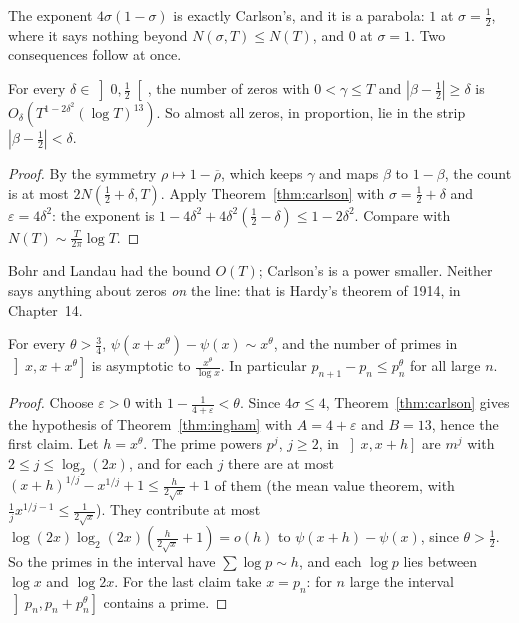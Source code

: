 The exponent $4\sigma(1-\sigma)$ is exactly Carlson's, and it is a parabola: $1$ at $\sigma=\frac12$, where it says nothing beyond $N(\sigma,T)\le N(T)$, and $0$ at $\sigma=1$. Two consequences follow at once.

\begin{corollary}\label{cor:bohrlandau}
For every $\delta\in\left]0,\frac12\right[$, the number of zeros with $0<\gamma\le T$ and $|\beta-\frac12|\ge\delta$ is $O_\delta(T^{1-2\delta^2}(\log T)^{13})$. So almost all zeros, in proportion, lie in the strip $|\beta-\frac12|<\delta$.
\end{corollary}
\begin{proof}
By the symmetry $\rho\mapsto1-\overline\rho$, which keeps $\gamma$ and maps $\beta$ to $1-\beta$, the count is at most $2N(\frac12+\delta,T)$. Apply Theorem~\ref{thm:carlson} with $\sigma=\frac12+\delta$ and $\varepsilon=4\delta^2$: the exponent is $1-4\delta^2+4\delta^2(\frac12-\delta)\le1-2\delta^2$. Compare with $N(T)\sim\frac T{2\pi}\log T$.
\end{proof}

Bohr and Landau had the bound $O(T)$; Carlson's is a power smaller. Neither says anything about zeros \emph{on} the line: that is Hardy's theorem of 1914, in Chapter~14.

\begin{corollary}\label{cor:hoheisel}
For every $\theta>\frac34$, $\psi(x+x^\theta)-\psi(x)\sim x^\theta$, and the number of primes in $\left]x,x+x^\theta\right]$ is asymptotic to $\frac{x^\theta}{\log x}$. In particular $p_{n+1}-p_n\le p_n^\theta$ for all large $n$.
\end{corollary}
\begin{proof}
Choose $\varepsilon>0$ with $1-\frac1{4+\varepsilon}<\theta$. Since $4\sigma\le4$, Theorem~\ref{thm:carlson} gives the hypothesis of Theorem~\ref{thm:ingham} with $A=4+\varepsilon$ and $B=13$, hence the first claim. Let $h=x^\theta$. The prime powers $p^j$, $j\ge2$, in $\left]x,x+h\right]$ are $m^j$ with
$2\le j\le\log_2(2x)$, and for each $j$ there are at most $(x+h)^{1/j}-x^{1/j}+1\le\frac{h}{2\sqrt x}+1$ of them (the mean value theorem, with $\frac1jx^{1/j-1}\le\frac1{2\sqrt x}$). They contribute at most $\log(2x)\log_2(2x)(\frac h{2\sqrt x}+1)=o(h)$ to $\psi(x+h)-\psi(x)$, since $\theta>\frac12$. So the primes in
the interval have $\sum\log p\sim h$, and each $\log p$ lies between $\log x$ and $\log 2x$. For the last claim take $x=p_n$: for $n$ large the interval $\left]p_n,p_n+p_n^\theta\right]$ contains a prime.
\end{proof}

